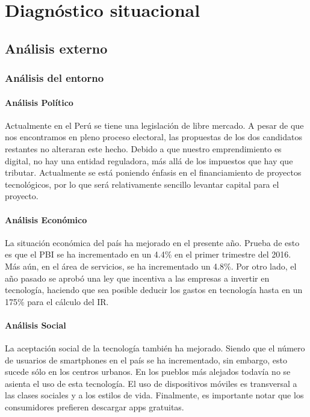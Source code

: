 \chapter{Diagnóstico situacional}

\section{Análisis externo}

\subsection{Análisis del entorno}
\subsubsection{Análisis Político}
Actualmente en el Perú se tiene una legislación de libre mercado. A pesar de que nos encontramos en pleno proceso electoral, las propuestas de los dos candidatos restantes no alteraran este hecho. Debido a que nuestro emprendimiento es digital, no hay una entidad reguladora, más allá de los impuestos que hay que tributar. Actualmente se está poniendo énfasis en el financiamiento de proyectos tecnológicos, por lo que será relativamente sencillo levantar capital para el proyecto.

\subsubsection{Análisis Económico}
La situación económica del país ha mejorado en el presente año. Prueba de esto es que el PBI se ha incrementado en un 4.4\% en el primer trimestre del 2016. Más aún, en el área de servicios, se ha incrementado un 4.8\%. Por otro lado, el año pasado se aprobó una ley que incentiva a las empresas a invertir en tecnología, haciendo que sea posible deducir los gastos en tecnología hasta en un 175\% para el cálculo del IR.

\subsubsection{Análisis Social}
La aceptación social de la tecnología también ha mejorado. Siendo que el número de usuarios de smartphones en el país se ha incrementado, sin embargo, esto sucede sólo en los centros urbanos. En los pueblos más alejados todavía no se asienta el uso de esta tecnología. El uso de dispositivos móviles es transversal a las clases sociales y a los estilos de vida. Finalmente, es importante notar que los consumidores prefieren descargar apps gratuitas.

